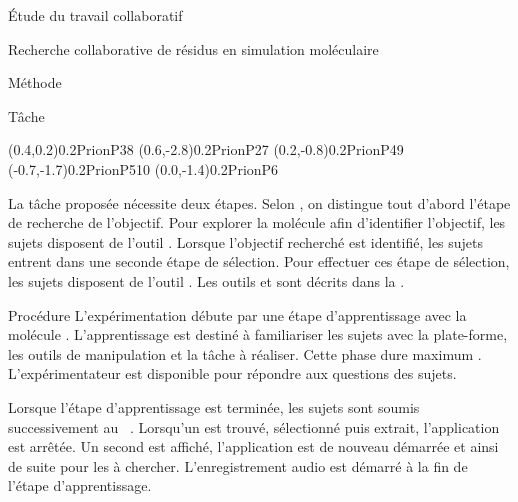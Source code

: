 \documentclass[myfrancais]{mythesis}
\begin{document}
\begin{mypart}{Étude du travail collaboratif}
\begin{mychapter}{Recherche collaborative de résidus en simulation moléculaire}
\begin{mysection}{Méthode}
\begin{mysubsection}{Tâche}
\begin{myfigure}
\begin{myps}
							\cnode(0.4,0.2){0.2}{PrionP38}
							\cnode(0.6,-2.8){0.2}{PrionP27}
							\cnode(0.2,-0.8){0.2}{PrionP49}
							\cnode(-0.7,-1.7){0.2}{PrionP510}
							\cnode(0.0,-1.4){0.2}{PrionP6}
						\end{myps}
					\end{myfigure}

					La tâche proposée nécessite deux étapes.
					Selon , on distingue tout d'abord l'étape de recherche de l'objectif.
					Pour explorer la molécule afin d'identifier l'objectif, les sujets disposent de l'outil .
					Lorsque l'objectif recherché est identifié, les sujets entrent dans une seconde étape de sélection.
					Pour effectuer ces étape de sélection, les sujets disposent de l'outil .
					Les outils  et  sont décrits dans la .
				\end{mysubsection}
				\begin{mysubsection}{Procédure}
					L'expérimentation débute par une étape d'apprentissage avec la molécule \myTRPZIPPER.
					L'apprentissage est destiné à familiariser les sujets avec la plate-forme, les outils de manipulation et la tâche à réaliser.
					Cette phase dure maximum .
					L'expérimentateur est disponible pour répondre aux questions des sujets.

					Lorsque l'étape d'apprentissage est terminée, les sujets sont soumis successivement au ~.
					Lorsqu'un  est trouvé, sélectionné puis extrait, l'application est arrêtée.
					Un second  est affiché, l'application est de nouveau démarrée et ainsi de suite pour les  à chercher.
					L'enregistrement audio est démarré à la fin de l'étape d'apprentissage.


\end{mysubsection}
\end{mysection}
\end{mychapter}
\end{mypart}
\end{document}
